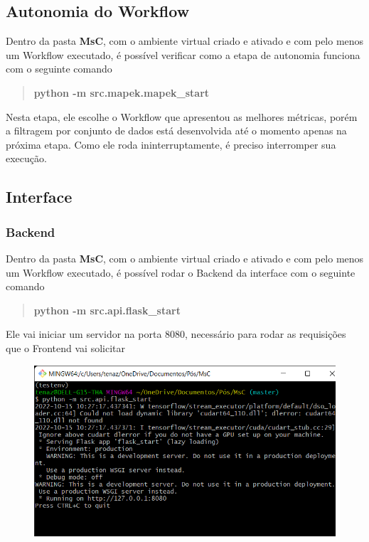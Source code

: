 \documentclass[portugues]{ic-tese}
\begin{document}
\subsection{Autonomia do Workflow}

Dentro da pasta \textbf{MsC}, com o ambiente virtual criado e ativado e com pelo menos um Workflow executado, é possível verificar como a etapa de autonomia funciona com o seguinte comando

\begin{quote}\textbf{python -m src.mapek.mapek\_start}\end{quote}

Nesta etapa, ele escolhe o Workflow que apresentou as melhores métricas, porém a filtragem por conjunto de dados está desenvolvida até o momento apenas na próxima etapa. Como ele roda ininterruptamente, é preciso interromper sua execução.

\subsection{Interface}

\subsubsection{Backend}

Dentro da pasta \textbf{MsC}, com o ambiente virtual criado e ativado e com pelo menos um Workflow executado, é possível rodar o Backend da interface com o seguinte comando

\begin{quote}\textbf{python -m src.api.flask\_start}\end{quote}

Ele vai iniciar um servidor na porta 8080, necessário para rodar as requisições que o Frontend vai solicitar

\begin{figure}[H]
\centering
\includegraphics[scale=0.4]{images/doc-install/backend-start.png}
\label{fig:DocInstallVirtualEnvBackendStart}
\end{figure}
\end{document}
